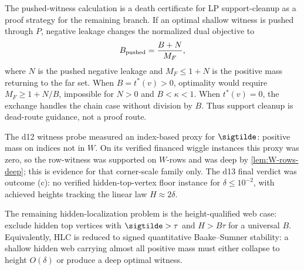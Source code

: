\begin{warning}
\provedbadge\label{warn:pushed-witness}
The pushed-witness calculation is a death certificate for LP
support-cleanup as a proof strategy for the remaining branch.  If an
optimal shallow witness is pushed through \(P\), negative leakage changes
the normalized dual objective to
\[
        B_{\rm pushed}=\frac{B+N}{M_F},
\]
where \(N\) is the pushed negative leakage and \(M_F\le1+N\) is the
positive mass returning to the far set.  When \(B=t^*(v)>0\), optimality
would require \(M_F\ge1+N/B\), impossible for \(N>0\) and \(B<\kappa<1\).
When \(t^*(v)=0\), the exchange handles the chain case without division by
\(B\).  Thus support cleanup is dead-route guidance, not a proof route.
\end{warning}

\begin{numericalresult}
\numbadge\label{num:d12-and-floor}
The d12 witness probe measured an index-based proxy for \(\sigtilde\):
positive mass on indices not in \(W\).  On its verified financed wiggle
instances this proxy was zero, so the row-witness was supported on
\(W\)-rows and was deep by \cref{lem:W-rows-deep}; this is evidence for
that corner-scale family only.  The d13 final verdict was outcome (c):
no verified hidden-top-vertex floor instance for \(\delta\le10^{-2}\),
with achieved heights tracking the linear law \(H\approx2\delta\).
\end{numericalresult}

\begin{openproblem}
\openbadge\label{open:height-conditional-web}
The remaining hidden-localization problem is the height-qualified web
case: exclude hidden top vertices with \(\sigtilde>\tau\) and \(H>B\tau\)
for a universal \(B\).  Equivalently, HLC is reduced to signed
quantitative Baake--Sumner stability: a shallow hidden web carrying
almost all positive mass must either collapse to height \(O(\delta)\) or
produce a deep optimal witness.
\end{openproblem}

